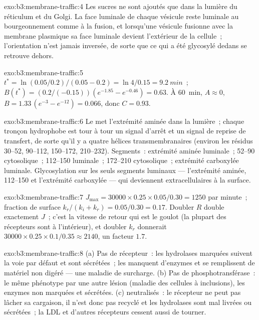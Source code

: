 \begin{solution}{exo:b3:membrane-traffic:4}
Les sucres ne sont ajoutés que dans la lumière du réticulum et du
Golgi. La face luminale de chaque vésicule reste luminale au
bourgeonnement comme à la fusion, et lorsqu'une vésicule fusionne avec
la membrane plasmique sa face luminale devient l'extérieur de la
cellule~; l'orientation n'est jamais inversée, de sorte que ce qui a été
glycosylé dedans se retrouve dehors.
\end{solution}

\begin{solution}{exo:b3:membrane-traffic:5}
$t^{*} = \ln(0.05/0.2)/(0.05 - 0.2) = \ln 4/0.15 = \qty{9.2}{min}$~;
$B(t^{*}) = (0.2/(-0.15))(e^{-1.85} - e^{-0.46}) = 0.63$. À \qty{60}{min},
$A \approx 0$, $B = 1.33\,(e^{-3} - e^{-12}) = 0.066$, donc $C = 0.93$.
\end{solution}

\begin{solution}{exo:b3:membrane-traffic:6}
Le  met l'extrémité aminée dans la lumière~; chaque
tronçon hydrophobe est tour à tour un signal d'arrêt et un signal de
reprise de transfert, de sorte qu'il y a quatre hélices
transmembranaires (environ les résidus 30--52, 90--112, 150--172,
210--232). Segments~: extrémité aminée luminale~; 52--90 cytosolique~;
112--150 luminale~; 172--210 cytosolique~; extrémité carboxylée
luminale. Glycosylation sur les seuls segments luminaux ---
l'extrémité aminée, 112--150 et l'extrémité carboxylée --- qui
deviennent extracellulaires à la surface.
\end{solution}

\begin{solution}{exo:b3:membrane-traffic:7}
$J_{\max} = \num{30000}\times 0.25\times 0.05/0.30 = 1250$ par minute~;
fraction de surface $k_{r}/(k_{i} + k_{r}) = 0.05/0.30 = 0.17$. Doubler
$R$ double exactement $J$~; c'est la vitesse de retour qui est le
goulot (la plupart des récepteurs sont à l'intérieur), et doubler
$k_{r}$ donnerait $\num{30000}\times 0.25
\times 0.1/0.35 \approx 2140$, un facteur $1.7$.
\end{solution}

\begin{solution}{exo:b3:membrane-traffic:8}
(a) Pas de récepteur~: les hydrolases marquées suivent la voie par
défaut et sont sécrétées~; les  manquent d'enzymes et se
remplissent de matériel non digéré --- une maladie de surcharge.
(b) Pas de phosphotransférase~: le même phénotype par une autre lésion
(maladie des cellules à inclusions), les enzymes non marquées et
sécrétées. (c)  neutralisés~: le récepteur ne peut pas lâcher
sa cargaison, il n'est donc pas recyclé et les hydrolases sont mal
livrées ou sécrétées~; la LDL et d'autres récepteurs cessent aussi de
tourner.
\end{solution}

